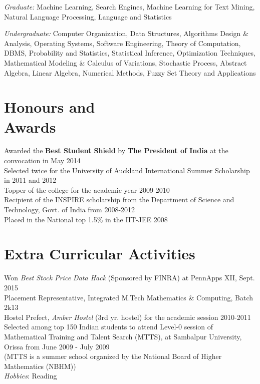 \documentclass[margin,line]{resume}
\begin{document}
\begin{resume}
		\textit{Graduate: }Machine Learning, Search Engines, Machine Learning for Text Mining, Natural Language Processing, Language and Statistics

   		\textit{Undergraduate: }Computer Organization,  Data Structures, Algorithms Design \& Analysis, Operating Systems, Software Engineering, Theory of Computation, DBMS, Probability and Statistics, Statistical Inference, Optimization Techniques, Mathematical Modeling \& Calculus of Variations, Stochastic Process, Abstract Algebra, Linear  Algebra, Numerical Methods, Fuzzy Set Theory and Applications


\section{\mysidestyle Honours and \\Awards}
			 Awarded the \textbf{Best Student Shield} by \textbf{The President of India} at the convocation in May 2014\vspace{2mm}
			 \\Selected twice for the University of Auckland International Summer Scholarship in 2011 and 2012 \vspace{2mm}
			 \\Topper of the college for the academic year 2009-2010\vspace{2mm}
			 \\Recipient of the INSPIRE scholarship from the Department of Science and Technology, Govt. of India from 2008-2012\vspace{2mm}
			 \\Placed in the National top 1.5\% in the IIT-JEE 2008 \vspace{2mm}

\section{\mysidestyle Extra Curricular Activities}
		Won \textit{Best Stock Price Data Hack} (Sponsored by FINRA) at PennApps XII, Sept. 2015\vspace{2mm}
		\\Placement Representative, Integrated M.Tech Mathematics \& Computing, Batch 2k13\vspace{2mm}
		\\Hostel Prefect, \textsl{Amber Hostel} (3rd yr. hostel) for the academic session 2010-2011\vspace{2mm}
		\\Selected among top 150 Indian students to attend Level-0 session of Mathematical Training and Talent Search (MTTS), at Sambalpur University, Orissa from June 2009 - July 2009
		\\(MTTS is a summer school organized by the National Board of Higher Mathematics (NBHM))\vspace{2mm}
		\\\textsl{Hobbies}: Reading

\end{resume}
\end{document}
